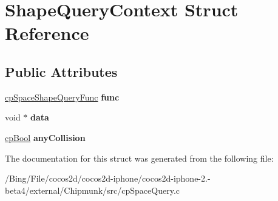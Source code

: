 \hypertarget{struct_shape_query_context}{\section{Shape\-Query\-Context Struct Reference}
\label{struct_shape_query_context}
}
\subsection*{Public Attributes}
\begin{DoxyCompactItemize}
\item 
\hypertarget{struct_shape_query_context_a5a18c6905d34fbb18dc8d1602090d137}{\hyperlink{group__cp_space_gaef86eb47a5ac16c373eb8b59599d1806}{cp\-Space\-Shape\-Query\-Func} {\bfseries func}}\label{struct_shape_query_context_a5a18c6905d34fbb18dc8d1602090d137}

\item 
\hypertarget{struct_shape_query_context_a9bf89d9198033f60a8af3d5fd78ee38d}{void $\ast$ {\bfseries data}}\label{struct_shape_query_context_a9bf89d9198033f60a8af3d5fd78ee38d}

\item 
\hypertarget{struct_shape_query_context_a8dfb7d84926f2036ae0b0422d39e115d}{\hyperlink{group__basic_types_gab6e5d8afee598a57cd323abae5310244}{cp\-Bool} {\bfseries any\-Collision}}\label{struct_shape_query_context_a8dfb7d84926f2036ae0b0422d39e115d}

\end{DoxyCompactItemize}


The documentation for this struct was generated from the following file\-:\begin{DoxyCompactItemize}
\item 
/\-Bing/\-File/cocos2d/cocos2d-\/iphone/cocos2d-\/iphone-\/2.-\/beta4/external/\-Chipmunk/src/cp\-Space\-Query.\-c\end{DoxyCompactItemize}
